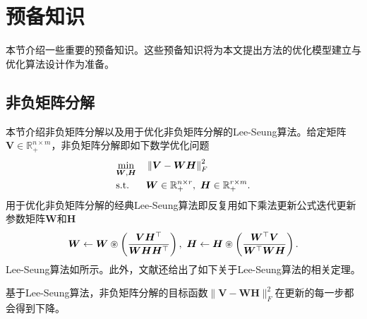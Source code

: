 \section{预备知识}
本节介绍一些重要的预备知识。这些预备知识将为本文提出方法的优化模型建立与优化算法设计作为准备。

\subsection{非负矩阵分解}\label{sec:nmf-dec}
本节介绍非负矩阵分解以及用于优化非负矩阵分解的Lee-Seung算法。给定矩阵$\boldsymbol{V}\in\mathbb{R}_{+}^{n\times m}$，非负矩阵分解即如下数学优化问题
\begin{equation*}
    \begin{aligned}
    & \underset{\smash[b]{\substack{\boldsymbol{W},\boldsymbol{H}}}}{\min}
    & &  \left\lVert\boldsymbol{V}-\boldsymbol{W}\boldsymbol{H}\right\rVert_{F}^{2}\\
    & \text{s.t.}
    & & \boldsymbol{W}\in\mathbb{R}_{+}^{n\times r},~\boldsymbol{H}\in\mathbb{R}_{+}^{r\times m}.
    \end{aligned}
\end{equation*}
用于优化非负矩阵分解的经典Lee-Seung算法即反复用如下乘法更新公式迭代更新参数矩阵$\boldsymbol{W}$和$\boldsymbol{H}$
\begin{equation*}
\begin{aligned}
    \boldsymbol{W}\leftarrow\boldsymbol{W}\oast\left(\frac{\boldsymbol{V}\boldsymbol{H}^{\top}}{\boldsymbol{W}\boldsymbol{H}\boldsymbol{H}^{\top}}\right),~\boldsymbol{H}\leftarrow\boldsymbol{H}\oast\left(\frac{\boldsymbol{W}^{\top}\boldsymbol{V}}{\boldsymbol{W}^{\top}\boldsymbol{W}\boldsymbol{H}}\right).
\end{aligned}
\end{equation*}
Lee-Seung算法如所示。此外，文献还给出了如下关于Lee-Seung算法的相关定理。

\begin{lemma}\label{lemma:lee-desc}\kaishu
    基于Lee-Seung算法，非负矩阵分解的目标函数$\|\boldsymbol{V}-\boldsymbol{W}\boldsymbol{H}\|_{F}^{2}$在更新的每一步都会得到下降。
\end{lemma}

\vspace{-1em}


